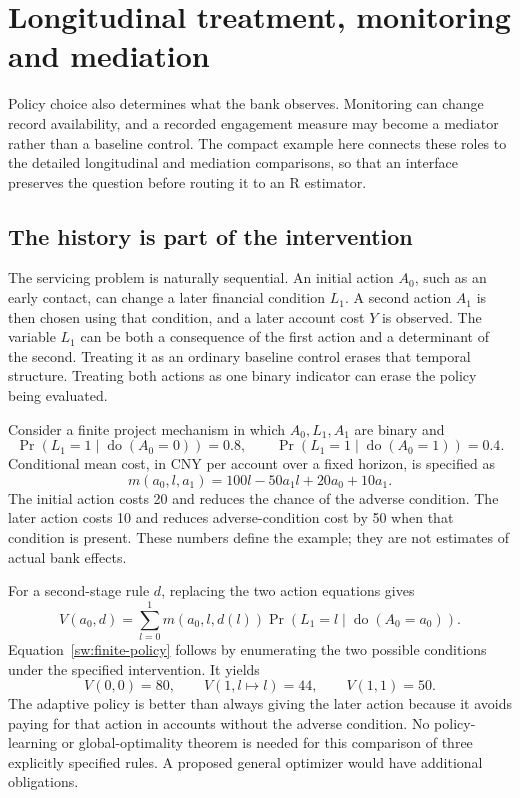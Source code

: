 \chapter{Longitudinal treatment, monitoring and mediation}
\label{sw:longitudinal}

Policy choice also determines what the bank observes. Monitoring can change
record availability, and a recorded engagement measure may become a mediator
rather than a baseline control. The compact example here connects these roles
to the detailed longitudinal and mediation comparisons, so that an interface
preserves the question before routing it to an R estimator.

\section{The history is part of the intervention}

The servicing problem is naturally sequential. An initial action \(A_0\), such
as an early contact, can change a later financial condition \(L_1\). A second
action \(A_1\) is then chosen using that condition, and a later account cost
\(Y\) is observed. The variable \(L_1\) can be both a consequence of the first
action and a determinant of the second. Treating it as an ordinary baseline
control erases that temporal structure. Treating both actions as one binary
indicator can erase the policy being evaluated.

Consider a finite project mechanism in which \(A_0,L_1,A_1\) are binary and
\[
 \Pr(L_1=1\mid\operatorname{do}(A_0=0))=0.8,
 \qquad
 \Pr(L_1=1\mid\operatorname{do}(A_0=1))=0.4.
\]
Conditional mean cost, in CNY per account over a fixed horizon, is specified as
\[
 m(a_0,l,a_1)=100l-50a_1l+20a_0+10a_1.
\]
The initial action costs 20 and reduces the chance of the adverse condition.
The later action costs 10 and reduces adverse-condition cost by 50 when that
condition is present. These numbers define the example; they are not estimates
of actual bank effects.

For a second-stage rule \(d\), replacing the two action equations gives
\begin{equation}
 V(a_0,d)=\sum_{l=0}^{1}m(a_0,l,d(l))
             \Pr(L_1=l\mid\operatorname{do}(A_0=a_0)).
 \label{sw:finite-policy}
\end{equation}
Equation~\eqref{sw:finite-policy} follows by enumerating the two possible
conditions under the specified intervention. It yields
\[
 V(0,0)=80,\qquad V(1,l\mapsto l)=44,\qquad V(1,1)=50.
\]
The adaptive policy is better than always giving the later action because it
avoids paying for that action in accounts without the adverse condition.
No policy-learning or global-optimality theorem is needed for this comparison
of three explicitly specified rules. A proposed general optimizer would have
additional obligations.

